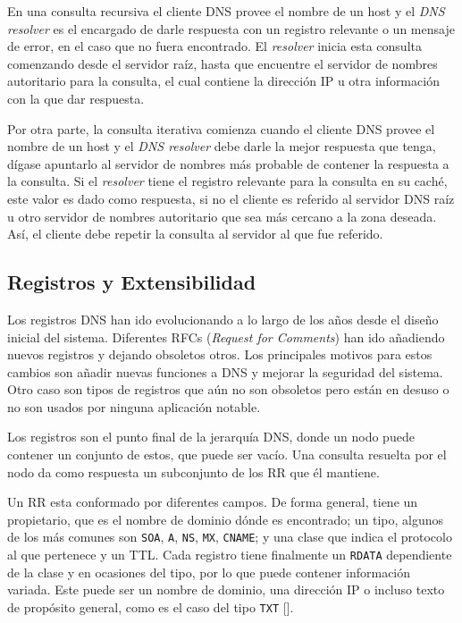 En una consulta recursiva el cliente DNS provee el nombre de un host y el \textit{DNS resolver} es el encargado de darle respuesta con un registro relevante o un mensaje de error, en el caso que no fuera encontrado. El \textit{resolver} inicia esta consulta comenzando desde el servidor raíz, hasta que encuentre el servidor de nombres autoritario para la consulta, el cual contiene la dirección IP u otra información con la que dar respuesta.

Por otra parte, la consulta iterativa comienza cuando el cliente DNS provee el nombre de un host y el \textit{DNS resolver} debe darle la mejor respuesta que tenga, dígase apuntarlo al servidor de nombres más probable de contener la respuesta a la consulta. Si el \textit{resolver} tiene el registro relevante para la consulta en su caché, este valor es dado como respuesta, si no el cliente es referido al servidor DNS raíz u otro servidor de nombres autoritario que sea más cercano a la zona deseada. Así, el cliente debe repetir la consulta al servidor al que fue referido.

\subsection{Registros y Extensibilidad}

Los registros DNS han ido evolucionando a lo largo de los años desde el diseño inicial del sistema. Diferentes RFCs (\textit{Request for Comments}) han ido añadiendo nuevos registros y dejando obsoletos otros. Los principales motivos para estos cambios son añadir nuevas funciones a DNS y mejorar la seguridad del sistema. Otro caso son tipos de registros que aún no son obsoletos pero están en desuso o no son usados por ninguna aplicación notable.

Los registros son el punto final de la jerarquía DNS, donde un nodo puede contener un conjunto de estos, que puede ser vacío. Una consulta resuelta por el nodo da como respuesta un subconjunto de los RR que él mantiene.

Un RR esta conformado por diferentes campos. De forma general, tiene un propietario, que es el nombre de dominio dónde es encontrado; un tipo, algunos de los más comunes son \verb|SOA|, \verb|A|, \verb|NS|, \verb|MX|, \verb|CNAME|; y una clase que indica el protocolo al que pertenece y un TTL. Cada registro tiene finalmente un \verb|RDATA| dependiente de la clase y en ocasiones del tipo, por lo que puede contener información variada. Este puede ser un nombre de dominio, una dirección IP o incluso texto de propósito general, como es el caso del tipo \verb|TXT| [\cite{rfc_1464}].

